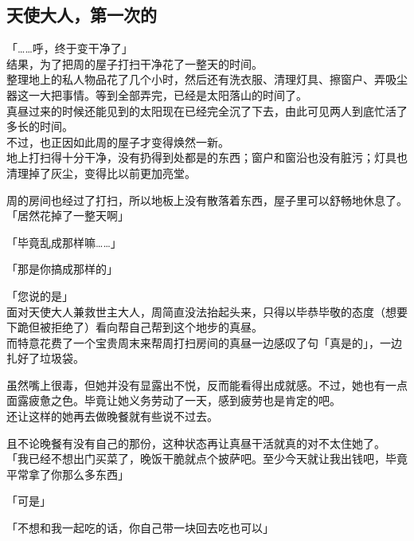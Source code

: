 \subsection{天使大人，第一次的}

「……呼，终于变干净了」\\

结果，为了把周的屋子打扫干净花了一整天的时间。\\

整理地上的私人物品花了几个小时，然后还有洗衣服、清理灯具、擦窗户、弄吸尘器这一大把事情。等到全部弄完，已经是太阳落山的时间了。\\

真昼过来的时候还能见到的太阳现在已经完全沉了下去，由此可见两人到底忙活了多长的时间。\\

不过，也正因如此周的屋子才变得焕然一新。\\

地上打扫得十分干净，没有扔得到处都是的东西；窗户和窗沿也没有脏污；灯具也清理掉了灰尘，变得比以前更加亮堂。

周的房间也经过了打扫，所以地板上没有散落着东西，屋子里可以舒畅地休息了。\\

「居然花掉了一整天啊」

「毕竟乱成那样嘛……」

「那是你搞成那样的」

「您说的是」\\

面对天使大人兼救世主大人，周简直没法抬起头来，只得以毕恭毕敬的态度（想要下跪但被拒绝了）看向帮自己帮到这个地步的真昼。\\

而特意花费了一个宝贵周末来帮周打扫房间的真昼一边感叹了句「真是的」，一边扎好了垃圾袋。

虽然嘴上很毒，但她并没有显露出不悦，反而能看得出成就感。不过，她也有一点面露疲惫之色。毕竟让她义务劳动了一天，感到疲劳也是肯定的吧。\\

还让这样的她再去做晚餐就有些说不过去。

且不论晚餐有没有自己的那份，这种状态再让真昼干活就真的对不太住她了。\\

「我已经不想出门买菜了，晚饭干脆就点个披萨吧。至少今天就让我出钱吧，毕竟平常拿了你那么多东西」

「可是」

「不想和我一起吃的话，你自己带一块回去吃也可以」\\

